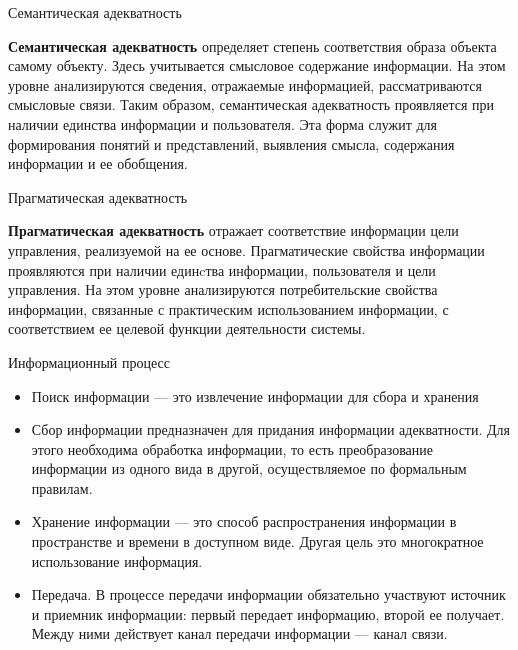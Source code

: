 \documentclass{beamer}
\begin{document}
\begin{frame}{Семантическая адекватность}

\textbf{Семантическая адекватность} определяет степень соответствия образа объекта самому объекту. 
Здесь учитывается смысловое содержание информации. На этом уровне анализируются сведения, отражаемые информацией, 
рассматриваются смысловые связи. 
Таким образом, семантическая адекватность проявляется при наличии единства информации и пользователя. 
Эта форма служит для формирования понятий и представлений, выявления смысла, содержания информации и ее обобщения.

\end{frame}

\begin{frame}{Прагматическая адекватность}

\textbf{Прагматическая адекватность} отражает соответствие информации цели управления, реализуемой на ее основе. 
Прагматические свойства информации проявляются при наличии единcтва информации, пользователя и цели управления. 
На этом уровне анализируются потребительские свойства информации, связанные с практическим использованием информации, 
с соответствием ее целевой функции деятельности системы.

\end{frame}

\begin{frame}{Информационный процесс}

\begin{small}

\begin{itemize}


  \item Поиск информации — это извлечение  информации  для сбора и хранения 

  \item Сбор информации предназначен для придания информации адекватности.  Для этого необходима обработка информации, то есть
   преобразование информации из одного вида в другой, осуществляемое по формальным правилам. 
 
  \item Хранение информации — это способ распространения информации в пространстве и времени в доступном виде. Другая цель это  многократное
   использование информация. 

  \item  Передача. В процессе передачи информации обязательно участвуют источник и приемник информации: первый передает информацию, второй ее получает. Между ними действует 
  канал передачи информации — канал связи. 
 
\end{itemize}

\end{small}

\end{frame}
\end{document}
